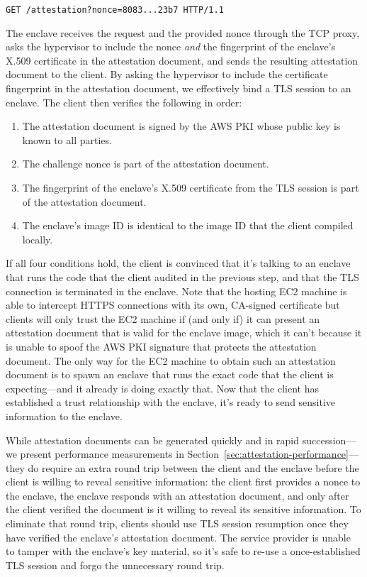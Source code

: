 \begin{lstlisting}[numbers=none]
GET /attestation?nonce=8083...23b7 HTTP/1.1
\end{lstlisting}


The enclave receives the request and the provided nonce through the TCP proxy, asks the hypervisor to
include the nonce \emph{and} the fingerprint of the enclave's X.509 certificate
in the attestation document, and sends the resulting attestation document to
the client.  By asking the hypervisor to include the certificate fingerprint in
the attestation document, we effectively bind a TLS session to an enclave.  The
client then verifies the following in order:

\begin{enumerate}
    \item The attestation document is signed by the AWS PKI whose public key is
      known to all parties.
    \item The challenge nonce is part of the attestation document.
    \item The fingerprint of the enclave's X.509 certificate from the TLS session is part of the
      attestation document.
    \item The enclave's image ID is identical to the image ID that the client
      compiled locally.
\end{enumerate}

If all four conditions hold, the client is convinced that it's talking to an
enclave that runs the code that the client audited in the previous step, and
that the TLS connection is terminated in the enclave.  Note that the hosting EC2
machine is able to intercept HTTPS connections with its own, CA-signed
certificate but clients will only trust the EC2 machine if (and only if) it can
present an attestation document that is valid for the enclave image, which it
can't because it is unable to spoof the AWS PKI signature that protects the
attestation document.  The only way for the EC2 machine to obtain such an
attestation document is to spawn an enclave that runs the exact code that the
client is expecting---and it already is doing exactly that.  Now that the client
has established a trust relationship with the enclave, it's ready to send
sensitive information to the enclave.

While attestation documents can be generated quickly and in rapid
succession---we present performance measurements in
Section~\ref{sec:attestation-performance}---they do require an extra round trip
between the client and the enclave before the client is willing to reveal
sensitive information: the client first provides a nonce to the enclave, the
enclave responds with an attestation document, and only after the client verified
the document is it willing to reveal its sensitive information.  To eliminate
that round trip, clients should use TLS session resumption once they have
verified the enclave's attestation document.  The service provider is unable to
tamper with the enclave's key material, so it's safe to re-use a
once-established TLS session and forgo the unnecessary round trip.

